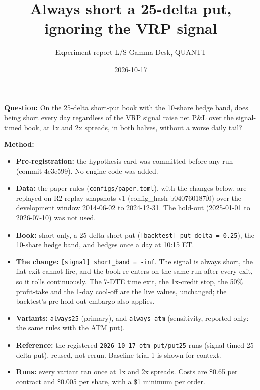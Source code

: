 \documentclass{article}
\title{Always short a 25-delta put, ignoring the VRP signal}
\author{Experiment report \textperiodcentered{} L/S Gamma Desk, QUANTT}
\date{2026-10-17}
\begin{document}
\maketitle

\textbf{Question:} On the 25-delta short-put book with the 10-share hedge band, does being short every day regardless of the VRP signal raise net P\&L over the signal-timed book, at 1x and 2x spreads, in both halves, without a worse daily tail?

\textbf{Method:}

\begin{itemize}

\item \textbf{Pre-registration:} the hypothesis card was committed before any run (commit 4e3e599). No engine code was added.

\item \textbf{Data:} the paper rules (\texttt{configs/\allowbreak{}paper.\allowbreak{}toml}), with the changes below, are replayed on R2 replay snapshots v1 (config\_hash b040760187f0) over the development window 2014-06-02 to 2024-12-31. The hold-out (2025-01-01 to 2026-07-10) was not used.

\item \textbf{Book:} short-only, a 25-delta short put (\texttt{[backtest] put\_\allowbreak{}delta = 0.\allowbreak{}25}), the 10-share hedge band, and hedges once a day at 10:15 ET.

\item \textbf{The change:} \texttt{[signal] short\_\allowbreak{}band = -\allowbreak{}inf}. The signal is always short, the flat exit cannot fire, and the book re-enters on the same run after every exit, so it rolls continuously. The 7-DTE time exit, the 1x-credit stop, the 50\% profit-take and the 1-day cool-off are the live values, unchanged; the backtest's pre-hold-out embargo also applies.

\item \textbf{Variants:} \texttt{always25} (primary), and \texttt{always\_\allowbreak{}atm} (sensitivity, reported only: the same rules with the ATM put).

\item \textbf{Reference:} the registered \texttt{2026-\allowbreak{}10-\allowbreak{}17-\allowbreak{}otm-\allowbreak{}put/\allowbreak{}put25} runs (signal-timed 25-delta put), reused, not rerun. Baseline trial 1 is shown for context.

\item \textbf{Runs:} every variant ran once at 1x and 2x spreads. Costs are \$0.65 per contract and \$0.005 per share, with a \$1 minimum per order.

\end{itemize}
\end{document}
